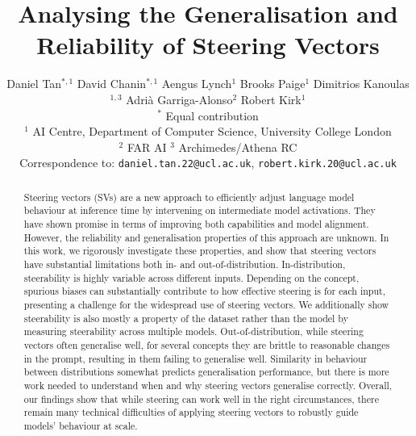\documentclass{article}
\title{Analysing the Generalisation and Reliability of Steering Vectors}
\author{%
  Daniel Tan$^{*,1}$ \And David Chanin$^{*,1}$ \And Aengus Lynch$^1$ \And Brooks Paige$^1$ \And Dimitrios Kanoulas$^{1,3}$ \And Adrià Garriga-Alonso$^2$ \And Robert Kirk$^1$ \vspace{5mm} \\
  $^*$ Equal contribution \\
  $^1$ AI Centre, Department of Computer Science, University College London\\
  \quad $^2$ FAR AI \quad $^3$ Archimedes/Athena RC \\
  Correspondence to: \texttt{daniel.tan.22@ucl.ac.uk}, \texttt{robert.kirk.20@ucl.ac.uk} \\
}
\begin{document}
\maketitle

\begin{abstract}

Steering vectors (SVs) are a new approach to efficiently adjust language model behaviour at inference time by intervening on intermediate model activations. They have shown promise in terms of improving both capabilities and model alignment. However, the reliability and generalisation properties of this approach are unknown. In this work, we rigorously investigate these properties, and show that steering vectors have substantial limitations both in- and out-of-distribution. In-distribution, steerability is highly variable across different inputs. Depending on the concept, spurious biases can substantially contribute to how effective steering is for each input, presenting a challenge for the widespread use of steering vectors. We additionally show steerability is also mostly a property of the dataset rather than the model by measuring steerability across multiple models. Out-of-distribution, while steering vectors often generalise well, for several concepts they are brittle to reasonable changes in the prompt, resulting in them failing to generalise well. Similarity in behaviour between distributions somewhat predicts generalisation performance, but there is more work needed to understand when and why steering vectors generalise correctly. Overall, our findings show that while steering can work well in the right circumstances, there remain many technical difficulties of applying steering vectors to robustly guide models' behaviour at scale.


\end{abstract}
\end{document}

